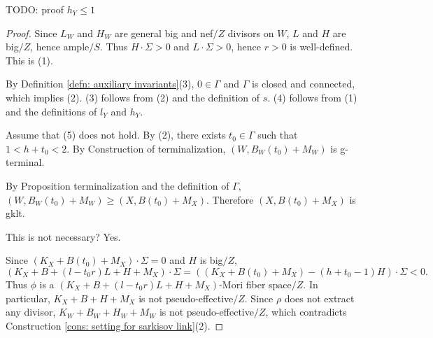 \documentclass[11pt]{amsart}
\numberwithin{equation}{section}
\newcommand{\Ii}{\Gamma}
\theoremstyle{definition}
\theoremstyle{definition}
\theoremstyle{definition}
\begin{document}
TODO: proof $h_{Y}\leq 1$
\begin{proof}
Since $L_W$ and $H_W$ are general big and nef$/Z$ divisors on $W$, $L$ and $H$ are big$/Z$, hence ample$/S$. Thus $H\cdot\Sigma>0$ and $L\cdot\Sigma>0$, hence $r>0$ is well-defined. This is (1).

By Definition \ref{defn: auxiliary invariants}(3), $0\in\Ii$ and $\Ii$ is closed and connected, which implies (2). (3) follows from (2) and the definition of $s$. (4) follows from (1) and the definitions of $l_Y$ and $h_Y$.



Assume that (5) does not hold. By (2), there exists $t_0\in\Ii$ such that $1<h+t_0<2$. By Construction of terminalization, $(W,B_W(t_0)+M_W)$ is g-terminal.

By Proposition terminalization and the definition of $\Ii$, $(W,B_W(t_0)+M_W)\geq (X,B(t_0)+M_X)$. Therefore $(X,B(t_0)+M_X)$ is gklt.

This is not necessary? Yes.

Since $(K_X+B(t_0)+M_X)\cdot\Sigma=0$ and $H$ is big$/Z$, 
$$(K_X+B+(l-t_0r)L+H+M_X)\cdot\Sigma=((K_X+B(t_0)+M_X)-(h+t_0-1)H)\cdot\Sigma<0.$$
Thus $\phi$ is a $(K_X+B+(l-t_0r)L+H+M_X)$-Mori fiber space$/Z$. In particular, $K_X+B+H+M_X$ is not pseudo-effective$/Z$. Since $\rho$ does not extract any divisor, $K_W+B_W+H_W+M_W$ is not pseudo-effective$/Z$, which contradicts Construction \ref{cons: setting for sarkisov link}(2).
\end{proof}
\end{document}

